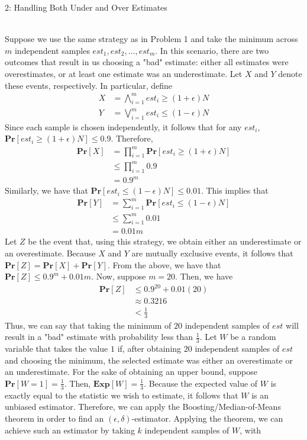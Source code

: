 \documentclass[12pt]{article}
\begin{document}
\begin{solution}
\begin{problem}{2: Handling Both Under and Over Estimates}
\end{problem}
\begin{solution} \ \\
Suppose we use the same strategy as in Problem 1 and take the minimum across $m$ independent samples $est_1, est_2, ..., est_m$. In this scenario, there are two outcomes that result in us choosing a "bad" estimate: either all estimates were overestimates, or at least one estimate was an underestimate. Let $X$ and $Y$ denote these events, respectively. In particular, define 
\begin{align*}
    X &= \bigwedge\limits_{i=1}^m est_i \geq (1 + \epsilon)N \\
    Y &= \bigvee\limits_{i=1}^m est_i \leq (1 - \epsilon)N
\end{align*}
Since each sample is chosen independently, it follows that for any $est_i$, $\textbf{Pr}[est_i \geq (1 + \epsilon)N] \leq 0.9$. Therefore,
\begin{align*}
    \textbf{Pr}[X] &= \prod\limits_{i=1}^m \textbf{Pr}[est_i \geq (1 + \epsilon)N] \\
    &\leq \prod\limits_{i=1}^m 0.9 \\
    &= 0.9^m
\end{align*}
Similarly, we have that $\textbf{Pr}[est_i \leq (1 - \epsilon)N] \leq 0.01$. This implies that
\begin{align*}
    \textbf{Pr}[Y] &= \sum\limits_{i=1}^m \textbf{Pr}[est_i \leq (1 - \epsilon)N] \\ 
    &\leq \sum\limits_{i=1}^m 0.01 \\
    &= 0.01m
\end{align*}
Let $Z$ be the event that, using this strategy, we obtain either an underestimate or an overestimate. Because $X$ and $Y$ are mutually exclusive events, it follows that $\textbf{Pr}[Z] = \textbf{Pr}[X] + \textbf{Pr}[Y]$. From the above, we have that $\textbf{Pr}[Z] \leq 0.9^m + 0.01m$. Now, suppose $m = 20$. Then, we have
\begin{align*}
    \textbf{Pr}[Z] &\leq 0.9^{20} + 0.01(20) \\
    &\approx 0.3216 \\
    &< \frac{1}{3}
\end{align*}
Thus, we can say that taking the minimum of $20$ independent samples of $est$ will result in a "bad" estimate with probability less than $\frac{1}{3}$. Let $W$ be a random variable that takes the value $1$ if, after obtaining $20$ independent samples of $est$ and choosing the minimum, the selected estimate was either an overestimate or an underestimate. For the sake of obtaining an upper bound, suppose $\textbf{Pr}[W = 1] = \frac{1}{3}$. Then, $\textbf{Exp}[W] = \frac{1}{3}$. Because the expected value of $W$ is exactly equal to the statistic we wish to estimate, it follows that $W$ is an unbiased estimator. Therefore, we can apply the Boosting/Median-of-Means theorem in order to find an $(\epsilon, \delta)$-estimator. Applying the theorem, we can achieve such an estimator by taking $k$ independent samples of $W$, with

\end{solution}
\end{solution}
\end{document}
